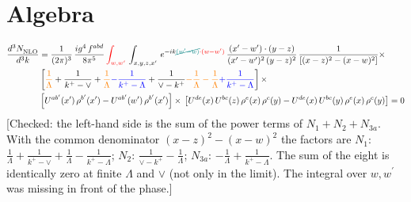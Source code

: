 \documentclass[9pt]{article}
\numberwithin{equation}{section}
\begin{document}
\section{Algebra}
\begin{align}
   \frac{d^{3}N_{\rm NLO}^{\rm}}{d^{3}k}  & = \frac{1}{(2\pi)^{3}}\,\frac{ig^{4}\,f^{abd}}{8\pi^{5}}\,{\color{red}\int_{w,w'}}\,\int_{x,y,z,x'}\, e^{-ik{\color{teal}\cancel{(w^\prime-w)}}{\color{red}\cdot(w-w^\prime)}}\,\frac{(x'-w')\cdot (y-z)}{(x'-w')^{2}\,(y-z)^{2}}\, \frac{1}{\left[(x-z)^{2}-(x-w)^{2}\right]}\times\,\notag \\ &  \left[{\color{orange}\frac{1}{\Lambda}}+\frac{1}{k^{+}-\vee}+{\color{orange}\frac{1}{\Lambda}}{\color{blue}-\frac{1}{k^{+}-\Lambda}}+\frac{1}{\vee - k^{+}}{\color{orange}-\frac{1}{\Lambda}-\frac{1}{\Lambda}}{\color{blue}+\frac{1}{k^{+}-\Lambda}}\right]\times\notag \\ & \left[U^{ab'}(x')\,\rho^{b'}(x')-U^{ab'}(w')\, \rho^{b'}(x')\right]\times\, \left[U^{de}(x)\,U^{bc}(z)\, \rho^{e}(x)\,\rho^{c}(y)-U^{de}(x)\,U^{bc}(y)\,\rho^{e}(x)\,\rho^{c}(y)\right]  = 0
\end{align} {\color{red}[Checked: the left-hand side is the sum of the power terms of $N_{1}+N_{2}+N_{3a}$. With the common denominator $(x-z)^{2}-(x-w)^{2}$ the factors are $N_{1}$: $\frac{1}{\Lambda}+\frac{1}{k^{+}-\vee}+\frac{1}{\Lambda}-\frac{1}{k^{+}-\Lambda}$; $N_{2}$: $\frac{1}{\vee-k^{+}}-\frac{1}{\Lambda}$; $N_{3a}$: $-\frac{1}{\Lambda}+\frac{1}{k^{+}-\Lambda}$. The sum of the eight is identically zero at finite $\Lambda$ and $\vee$ (not only in the limit). The integral over $w,w^\prime$ was missing in front of the phase.]}\par\noindent
\end{document}
